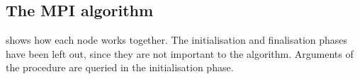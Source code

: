 \begin{algorithm*}[t]
\begin{multicols}{2}
\begin{algorithmic}[1]
                \label{MPIalg_result}
            \EndIf\label{MPIalg_sendend}
        \EndFor\label{MPIalg_forend}
        \label{MPIalg_whilecount}
    \EndWhile\label{MPIalg_whileend}
\EndProcedure
\Statex
{} \label{MPIalg_functionbegin}
    \label{MPIalg_functionifbegin}
         \label{MPIalg_diagonal_size}
        \Indent \label{MPIalg_copymem}
            \EndIndent
        \Statex
        \Indent \label{MPIalg_writecol1}
            \EndIndent
        \Indent \label{MPIalg_writecol2}
            \EndIndent
    \Else
         \label{MPIalg_writecol3}
        \Indent \label{MPIalg_writecol4}
            \EndIndent
    \EndIf\label{MPIalg_functionifend}
    \Statex{\hspace{0.6cm}\vdots}
      \label{MPIalg_readcol}
\EndFunction \label{MPIalg_functionend}
\end{algorithmic}
\end{multicols}
\end{algorithm*}

\subsection{The MPI algorithm}
 shows how each node works together.
The initialisation and finalisation phases have been left out, since they are not important to the algorithm.
Arguments of the procedure are queried in the initialisation phase.

